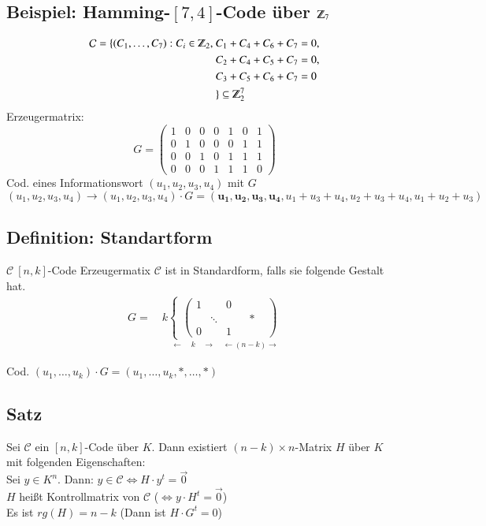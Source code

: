 \subsection{Beispiel: Hamming-$[7,4]$-Code \"uber $\Z_7$}

\begin{align*}
\mathcal{C} = \lbrace (C_1,\ldots,C_7) : C_i \in \Z_2,\ &C_1 + C_4 + C_6 + C_7 = 0,\\
										&C_2 + C_4 + C_5 + C_7 = 0,\\
										&C_3 + C_5 + C_6 + C_7 = 0\\
										 &\rbrace \subseteq \Z_2^7
\end{align*}
\noindent
Erzeugermatrix:
\[	G=
	\begin{pmatrix}
		1 & 0 & 0 & 0 & 1 & 0 & 1\\
		0 & 1 & 0 & 0 & 0 & 1 & 1\\
		0 & 0 & 1 & 0 & 1 & 1 & 1\\
		0 & 0 & 0 & 1 & 1 & 1 & 0
	\end{pmatrix}
\]
Cod. eines Informationswort $(u_1,u_2,u_3,u_4)$ mit $G$
\[
	(u_1,u_2,u_3,u_4) \rightarrow (u_1,u_2,u_3,u_4) \cdot G =  (\mathbf{u_1,u_2,u_3,u_4},u_1+u_3+u_4,u_2+u_3+u_4,u_1+u_2+u_3)
\]
\subsection{Definition: Standartform}
$\mathcal{C} \  [n,k]$-Code Erzeugermatix $\mathcal{C}$ ist in Standardform, falls sie folgende Gestalt hat.
\begin{align*}
	G= \quad
	k
	\underset{\leftarrow \quad k \quad \rightarrow \quad \leftarrow (n-k) \rightarrow}{
	\begin{cases}
	\begin{pmatrix}
		1 & & 0\\
		 & \ddots & & & * & \\
		0 & & 1 & &
	\end{pmatrix}
	\end{cases}
	}
\end{align*}

Cod. $(u_1,\ldots,u_k) \cdot G = (u_1,\ldots,u_k,*,\ldots,*)$

\subsection{Satz}
Sei $\mathcal{C}$ ein $[n,k]$-Code \"uber $K$. Dann existiert $(n-k)\times n$-Matrix $H$ \"uber $K$ mit folgenden Eigenschaften: \\
Sei $y\in K^n$. Dann: $y \in \mathcal{C} \Leftrightarrow H \cdot y^t = \vec{0}$ 
\\
$H$ hei\ss t Kontrollmatrix von $\mathcal{C}$ ($\Leftrightarrow y \cdot H^t = \vec{0}$) \\
Es ist $rg(H)=n-k$ (Dann ist $H \cdot G^t=0$)

